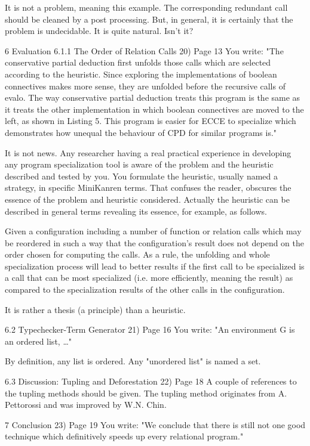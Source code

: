 It is not a problem, meaning this example. The corresponding redundant call should be cleaned by a post processing.
But, in general, it is certainly that the problem is undecidable. It is quite natural. Isn't it?


6 Evaluation
6.1.1 The Order of Relation Calls
20) Page 13
You write: "The conservative partial deduction first unfolds those calls which are selected according to the heuristic. Since exploring the implementations of boolean connectives makes more sense, they are unfolded before the recursive calls of evalo. The way conservative partial deduction treats this program is the same as it treats the other implementation in which boolean connectives are moved to the left, as shown in Listing 5. This program is easier for ECCE to specialize which demonstrates how unequal the behaviour of CPD for similar programs is."

It is not news. Any researcher having a real practical experience in developing any program specialization tool is aware of the problem and the heuristic described and tested by you. You formulate the heuristic, usually named a strategy, in specific MiniKanren terms. That confuses the reader, obscures the essence of the problem and heuristic considered. Actually the heuristic can be described in general terms revealing its essence,
for example, as follows.

Given a configuration including a number of function or relation calls which may be reordered in such a way that the configuration's result does not depend on the order chosen for computing the calls. As a rule, the unfolding and whole specialization process will lead to better results if the first call to be specialized is a call that can be most specialized (i.e. more efficiently, meaning the result) as compared to the specialization results of the other calls in the configuration.

It is rather a thesis (a principle) than a heuristic.

6.2 Typechecker-Term Generator
21) Page 16
You write: "An environment G is an ordered list, …"

By definition, any list is ordered. Any "unordered list" is named a set.


6.3 Discussion: Tupling and Deforestation
22) Page 18
A couple of references to the tupling methods should be given. The tupling method originates from A. Pettorossi and was improved by W.N. Chin.


7 Conclusion
23) Page 19
You write: "We conclude that there is still not one good technique which definitively speeds up every relational program."

